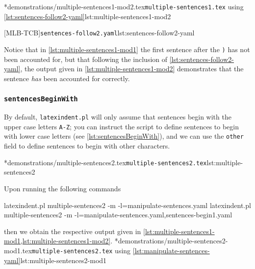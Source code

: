 	\begin{minipage}{.55\linewidth}
		\cmhlistingsfromfile*[showspaces=false]*{demonstrations/multiple-sentences1-mod2.tex}{\texttt{multiple-sentences1.tex} using \cref{lst:sentences-follow2-yaml}}{lst:multiple-sentences1-mod2}
	\end{minipage}
	\hfill
	\begin{minipage}{.45\linewidth}
		[MLB-TCB]{\texttt{sentences-follow2.yaml}}{lst:sentences-follow2-yaml}
	\end{minipage}

	Notice that in \cref{lst:multiple-sentences1-mod1} the first sentence after the \texttt{)} has not been accounted for, but that following the inclusion of \cref{lst:sentences-follow2-yaml}, the output given in \cref{lst:multiple-sentences1-mod2} demonstrates that the sentence \emph{has} been accounted for correctly.

\subsubsection{\texttt{sentencesBeginWith}}
	By default, \texttt{latexindent.pl} will only assume that sentences begin with the upper case letters \texttt{A-Z}; you can instruct the script to define sentences to begin with lower case letters (see \cref{lst:sentencesBeginWith}), and we can use the \texttt{other} field to define sentences to begin with other characters.

	\cmhlistingsfromfile*[showspaces=false]*{demonstrations/multiple-sentences2.tex}{\texttt{multiple-sentences2.tex}}{lst:multiple-sentences2}

	Upon running the following commands \begin{widepage} \begin{commandshell}
latexindent.pl multiple-sentences2 -m -l=manipulate-sentences.yaml
latexindent.pl multiple-sentences2 -m -l=manipulate-sentences.yaml,sentences-begin1.yaml
	\end{commandshell} \end{widepage} then we obtain the respective output given in \cref{lst:multiple-sentences1-mod1,lst:multiple-sentences1-mod2}.
	\cmhlistingsfromfile*[showspaces=false]*{demonstrations/multiple-sentences2-mod1.tex}{\texttt{multiple-sentences2.tex} using \vref{lst:manipulate-sentences-yaml}}{lst:multiple-sentences2-mod1}

